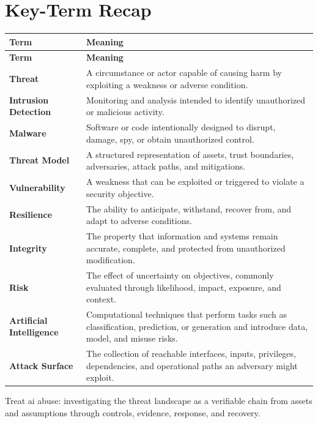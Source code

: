 \documentclass[11pt]{article}
\begin{document}
\section*{Key-Term Recap}
\begin{longtable}{>{\RaggedRight\arraybackslash}p{}>{\RaggedRight\arraybackslash}p{}}
\toprule\rowcolor{Navy}\color{white}\textbf{Term} & \color{white}\textbf{Meaning}\\\midrule
\endfirsthead
\toprule\rowcolor{Navy}\color{white}\textbf{Term} & \color{white}\textbf{Meaning}\\\midrule
\endhead
\textbf{Threat} & A circumstance or actor capable of causing harm by exploiting a weakness or adverse condition. \\\midrule
\textbf{Intrusion Detection} & Monitoring and analysis intended to identify unauthorized or malicious activity. \\\midrule
\textbf{Malware} & Software or code intentionally designed to disrupt, damage, spy, or obtain unauthorized control. \\\midrule
\textbf{Threat Model} & A structured representation of assets, trust boundaries, adversaries, attack paths, and mitigations. \\\midrule
\textbf{Vulnerability} & A weakness that can be exploited or triggered to violate a security objective. \\\midrule
\textbf{Resilience} & The ability to anticipate, withstand, recover from, and adapt to adverse conditions. \\\midrule
\textbf{Integrity} & The property that information and systems remain accurate, complete, and protected from unauthorized modification. \\\midrule
\textbf{Risk} & The effect of uncertainty on objectives, commonly evaluated through likelihood, impact, exposure, and context. \\\midrule
\textbf{Artificial Intelligence} & Computational techniques that perform tasks such as classification, prediction, or generation and introduce data, model, and misuse risks. \\\midrule
\textbf{Attack Surface} & The collection of reachable interfaces, inputs, privileges, dependencies, and operational paths an adversary might exploit. \\\midrule
\bottomrule
\end{longtable}
\begin{takeawaybox}
Treat ai abuse: investigating the threat landscape as a verifiable chain from assets and assumptions through controls, evidence, response, and recovery.
\end{takeawaybox}
\end{document}

